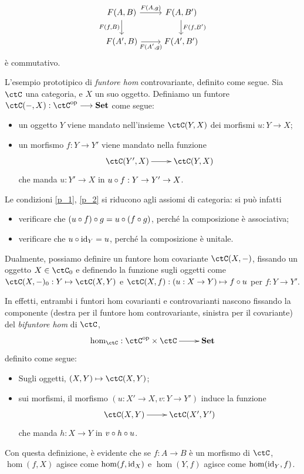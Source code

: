 \[
	\begin{tikzcd}
		F(A,B) \ar[r, "{F(A,g)}"]\ar[d, "{F(f,B)}"'] & F(A,B') \ar[d, "{F(f,B')}"]\\
		F(A',B) \ar[r, "{F(A',g)}"'] & F(A',B')
	\end{tikzcd}
\]
è commutativo.
\begin{example}\label{ex_hom_funtore}
	L'esempio prototipico di \emph{funtore hom} controvariante, definito come segue. Sia \(\ctC\) una categoria, e \(X\) un suo oggetto. Definiamo un funtore \(\ctC(-,X) : \ctC^\op\fun\ctSet\) come segue:
	\begin{itemize}
		\item un oggetto \(Y\) viene mandato nell'insieme \(\ctC(Y,X)\) dei morfismi \(u : Y\to X\);
		\item un morfismo \(f : Y\to Y'\) viene mandato nella funzione
		      \[\xymatrix{
				      \ctC(Y',X) \ar[r] & \ctC(Y,X)
			      }\]
		      che manda \(u : Y'\to X\) in \(u\circ f : Y\to Y' \to X\).
	\end{itemize}
	Le condizioni \ref{p_1}, \ref{p_2} si riducono agli assiomi di categoria: si può infatti
	\begin{itemize}
		\item verificare che \((u\circ f)\circ g = u\circ (f\circ g)\), perché la composizione è associativa;
		\item verificare che \(u\circ \mathrm{id}_Y = u\), perché la composizione è unitale.
	\end{itemize}
	Dualmente, possiamo definire un funtore hom covariante \(\ctC(X,-)\), fissando un oggetto \(X\in\ctC_0\) e definendo la funzione sugli oggetti come \(\ctC(X,-)_0 : Y\mapsto \ctC(X,Y)\) e \(\ctC(X,f) : (u : X\to Y)\mapsto f\cmp u\) per \(f : Y\to Y'\).

	 In effetti, entrambi i funtori hom covarianti e controvarianti nascono fissando la componente (destra per il funtore hom controvariante, sinistra per il covariante) del \emph{bifuntore hom} di \(\ctC\),
	\[\xymatrix{\hom_\ctC : \ctC^\op\times\ctC \ar[r] & \ctSet}\]
	definito come segue:
	\begin{itemize}
		\item Sugli oggetti, \((X,Y)\mapsto \ctC(X,Y)\);
		\item sui morfismi, il morfismo \((u : X'\to X, v : Y\to Y')\) induce la funzione
		      \[\xymatrix{\ctC(X,Y) \ar[r] & \ctC(X',Y')}\]
		      che manda \(h : X\to Y\) in \(v\circ h\circ u\).
	\end{itemize}
	Con questa definizione, è evidente che se \(f : A\to B\) è un morfismo di \(\ctC\), \(\hom(f,X)\) agisce come \(\hom(f,\mathrm{id}_X)\) e \(\hom(Y,f)\) agisce come \(\hom(\mathrm{id}_Y,f)\).
\end{example}
